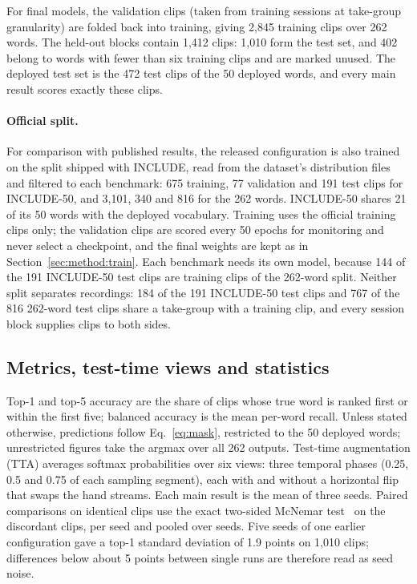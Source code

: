 \documentclass[pdflatex,sn-mathphys-num,twocolumn,lineno]{sn-jnl}
\theoremstyle{thmstyleone}%
\begin{document}
For final models, the validation clips (taken from training sessions at take-group granularity) are folded back into training, giving 2,845 training clips over 262 words. The held-out blocks contain 1,412 clips: 1,010 form the test set, and 402 belong to words with fewer than six training clips and are marked unused. The deployed test set is the 472 test clips of the 50 deployed words, and every main result scores exactly these clips.

\paragraph{Official split.} For comparison with published results, the released configuration is also trained on the split shipped with INCLUDE, read from the dataset's distribution files and filtered to each benchmark: 675 training, 77 validation and 191 test clips for INCLUDE-50, and 3,101, 340 and 816 for the 262 words. INCLUDE-50 shares 21 of its 50 words with the deployed vocabulary. Training uses the official training clips only; the validation clips are scored every 50 epochs for monitoring and never select a checkpoint, and the final weights are kept as in Section~\ref{sec:method:train}. Each benchmark needs its own model, because 144 of the 191 INCLUDE-50 test clips are training clips of the 262-word split. Neither split separates recordings: 184 of the 191 INCLUDE-50 test clips and 767 of the 816 262-word test clips share a take-group with a training clip, and every session block supplies clips to both sides.

\subsection{Metrics, test-time views and statistics}\label{sec:method:metrics}
Top-1 and top-5 accuracy are the share of clips whose true word is ranked first or within the first five; balanced accuracy is the mean per-word recall. Unless stated otherwise, predictions follow Eq.~\eqref{eq:mask}, restricted to the 50 deployed words; unrestricted figures take the argmax over all 262 outputs. Test-time augmentation (TTA) averages softmax probabilities over six views: three temporal phases (0.25, 0.5 and 0.75 of each sampling segment), each with and without a horizontal flip that swaps the hand streams. Each main result is the mean of three seeds. Paired comparisons on identical clips use the exact two-sided McNemar test~\cite{mcnemar1947} on the discordant clips, per seed and pooled over seeds. Five seeds of one earlier configuration gave a top-1 standard deviation of 1.9 points on 1,010 clips; differences below about 5 points between single runs are therefore read as seed noise.
\end{document}
